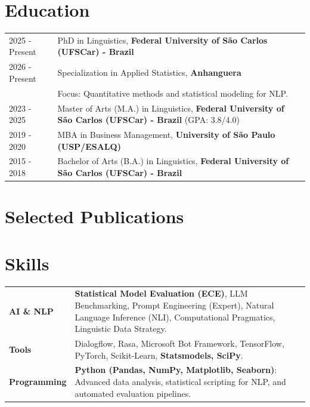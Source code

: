 \documentclass[a4paper]{article}
\begin{document}
\vspace{10pt}

\section{Education}
\begin{tabularx}{\linewidth}{@{}l X@{}}
2025 - Present & PhD in Linguistics, \textbf{Federal University of São Carlos (UFSCar) - Brazil} \\
2026 - Present & Specialization in Applied Statistics, \textbf{Anhanguera} \\
               & \small{Focus: Quantitative methods and statistical modeling for NLP.} \\
2023 - 2025    & Master of Arts (M.A.) in Linguistics, \textbf{Federal University of São Carlos (UFSCar) - Brazil} \hfill \normalsize{(GPA: 3.8/4.0)} \\
2019 - 2020    & MBA in Business Management, \textbf{University of São Paulo (USP/ESALQ)} \\
2015 - 2018    & Bachelor of Arts (B.A.) in Linguistics, \textbf{Federal University of São Carlos (UFSCar) - Brazil} \\
\end{tabularx}


\section{Selected Publications}
\nocite{santos2025engineering,santos2025linguasagem,santos2025disfluencies,santos2026lpkm}
\printbibliography[heading=none]

\section{Skills}
\begin{tabularx}{\linewidth}{@{}l X@{}}
\textbf{AI \& NLP} & \textbf{Statistical Model Evaluation (ECE)}, LLM Benchmarking, Prompt Engineering (Expert), Natural Language Inference (NLI), Computational Pragmatics, Linguistic Data Strategy. \\
\textbf{Tools} & Dialogflow, Rasa, Microsoft Bot Framework, TensorFlow, PyTorch, Scikit-Learn, \textbf{Statsmodels, SciPy}. \\
\textbf{Programming} & \textbf{Python (Pandas, NumPy, Matplotlib, Seaborn)}: Advanced data analysis, statistical scripting for NLP, and automated evaluation pipelines. \\
\end{tabularx}
\end{document}
